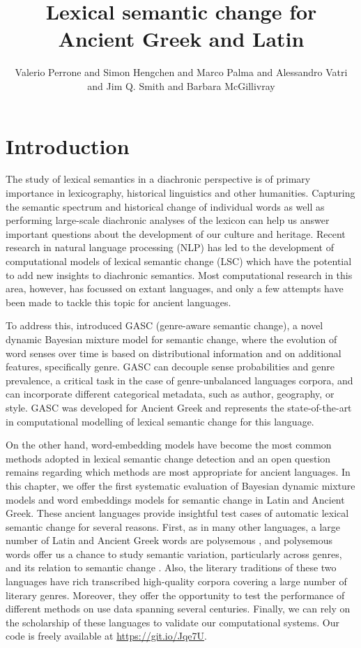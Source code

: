 \documentclass[output=paper]{langscibook}
\author{Valerio Perrone\affiliation{Amazon} and
Simon Hengchen\affiliation{University of Gothenburg} and
Marco Palma\orcid{0000-0003-0497-9001}\affiliation{University of Warwick} and
Alessandro Vatri\affiliation{University of Oxford} and
Jim Q. Smith\affiliation{University of Warwick; The Alan Turing Institute} and
Barbara McGillivray\affiliation{University of Cambridge; The Alan Turing Institute}}
\title{Lexical semantic change for Ancient Greek and Latin}
\begin{document}
\maketitle


\section{Introduction}

The study of lexical semantics in a diachronic perspective is of primary importance in lexicography, historical linguistics and other humanities. 
Capturing the semantic spectrum and historical change of individual words as well as performing large-scale diachronic analyses of the lexicon  can help us answer important questions about the development of our culture and heritage. 
Recent research in natural language processing (NLP) has led to the development of computational models of lexical semantic change (LSC) which have the potential to add new insights to diachronic semantics. Most computational research in this area, however, has focussed on extant languages, and only a few attempts have been made to tackle this topic for ancient languages. 


To address this, \citet{perrone-etal-2019-gasc} introduced GASC (genre-aware semantic change), a novel dynamic Bayesian mixture model for semantic change, where the evolution of word senses over time is based on distributional information and on additional features, specifically genre. GASC can decouple sense probabilities and genre prevalence, a critical task in the case of genre-unbalanced languages corpora, 
and can incorporate different categorical metadata, such as author, geography, or style. GASC was developed for Ancient Greek and represents the state-of-the-art in computational modelling of lexical semantic change for this language. 

On the other hand, word-embedding models have become the most common methods adopted in lexical semantic change detection \citep{kutuzov-etal-2018-diachronic} and an open question remains regarding which methods are most appropriate for ancient languages. 
In this chapter, we offer the first systematic evaluation of Bayesian dynamic mixture models and word embeddings models for semantic change in Latin and Ancient Greek.
These ancient languages provide insightful test cases of automatic lexical semantic change for several reasons. First, as in many other languages, a large number of Latin and Ancient Greek words are polysemous \citep{bakker_register_2010}, and polysemous words offer us a chance to study semantic variation, particularly across genres, and its relation to semantic change \citep{leiwoetal2012}. 
Also, the literary traditions of these two languages have rich transcribed high-quality corpora covering a large number of literary genres. Moreover, they offer the opportunity to test the performance of different methods on use data spanning several centuries. Finally, we can rely on the scholarship of these languages to validate our computational systems.
Our code is freely available at \url{https://git.io/Jqe7U}.
\end{document}

